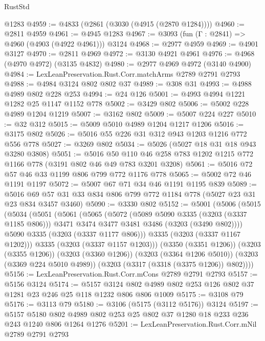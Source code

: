 \begin{lexlean}{RustStd}
\begin{coremodule}
    @1283
@4959 := @4833 (@2861 (@3030 (@4915 (@2870 @1284))))
@4960 := @2811 @4959
@4961 := @4945 @1283
@4967 := @3093 (fun (Γ : @2841) => @4960 (@4903 (@4922 @4961))) @3124
@4968 := @2977 @4959
@4969 := @4901 @3127
@4970 := @2811 @4969
@4972 := @3130 @4921 @4961
@4976 := @4968 (@4970 @4972) (@3135 @4832)
@4980 := @2977 @4969 @4972 (@3140 @4900)
@4984 := LexLeanPreservation.Rust.Corr.matchArms @2789 @2791 @2793
@4988 := @4984 @3124 @802 @802 @37
@4989 := @308 @31
@4993 := @4988 @4989 @802 @228 @253
@4994 := @24 @126
@5001 := @4993 @4994 @1221 @1282 @25 @1147 @1152 @778
@5002 := @3429 @802
@5006 := @5002 @228 @4989 @1204 @1219
@5007 := @3162 @802
@5009 := @5007 @224 @227
@5010 := @32 @312
@5015 := @5009 @5010 @4989 @1204 @1217 @1206
@5016 := @3175 @802
@5026 := @5016 @55 @226 @31 @312 @943 @1203 @1216 @772 @556 @778
@5027 := @3269 @802
@5034 := @5026 (@5027 @18 @31 @18 @943 @3280 @3808)
@5051 := @5016
    @50
    @110
    @46
    @258
    @783
    @1202
    @1215
    @772
    @1166
    @778
    (@3191 @802 @46 @49 @783 @3201 @3208)
@5061 := @5016 @72 @57 @46 @33 @1199 @806 @799 @772 @1176 @778
@5065 := @5002 @72 @46 @1191 @1197
@5072 := @5007 @67 @71 @34 @46 @1191 @1195 @839
@5089 := @5016 @69 @57 @31 @33 @834 @806 @799 @772 @1184 @778 (@5027 @23 @31 @23 @834 @3457 @3460)
@5090 := @3330 @802
@5152 := @5001
    (@5006
      (@5015
        (@5034
          (@5051
            (@5061
              (@5065
                (@5072
                  (@5089 @5090 @3335 (@3203 (@3337 @1185 @806)))
                  @3471
                  @3474
                  @3477
                  @3481
                  @3486
                  (@3203 (@3490 @802))))
              @5090
              @3335
              (@3203 (@3337 @1177 @806)))
            @3335
            (@3203 (@3337 @1167 @1202)))
          @3335
          (@3203 (@3337 @1157 @1203)))
        (@3350 (@3351 @1206))
        (@3203 (@3355 @1206))
        (@3203 (@3360 @1206))
        (@3203 (@3364 @1206 @5010))
        (@3203 (@3369 @224 @5010 @4989))
        (@3203 (@3317 (@3318 (@3375 @1206)) @802))))
@5156 := LexLeanPreservation.Rust.Corr.mCons @2789 @2791 @2793
@5157 := @5156 @3124
@5174 := @5157
    @3124
    @802
    @4989
    @802
    @253
    @126
    @802
    @37
    @1281
    @23
    @246
    @25
    @118
    @1232
    @806
    @806
    @1009
@5175 := @3108 @79
@5176 := @3113 @79
@5180 := @3106 (@5175 (@3112 @5176)) @3124
@5197 := @5157
    @5180
    @802
    @4989
    @802
    @253
    @25
    @802
    @37
    @1280
    @18
    @233
    @236
    @243
    @1240
    @806
    @1264
    @1276
@5201 := LexLeanPreservation.Rust.Corr.mNil @2789 @2791 @2793

\end{coremodule}
\end{lexlean}
